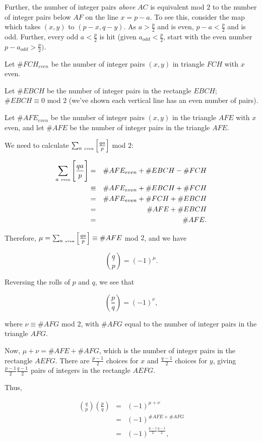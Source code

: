 \documentclass[12pt,letterpaper]{report}
\newcommand\be{\begin{equation}}
\newcommand\ee{\end{equation}}
\newcommand\bea{\begin{eqnarray}}
\newcommand\eea{\end{eqnarray}}
\newcommand\lag[2]{\ensuremath{\left(\frac{#1}{#2}\right)}}
\newcommand{\js}[1]{ { \underline{#1} \choose p} }
\begin{document}
Further, the number of integer pairs \emph{above} $AC$ is
equivalent mod $2$ to the number of integer pairs below $AF$ on
the line $x = p-a$. To see this, consider the map which takes
$(x,y)$ to $(p-x,q-y)$. As $a > \frac{p}{2}$ and is even, $p-a <
\frac{p}{2}$ and is odd. Further, every odd $a < \frac{p}{2}$ is
hit (given $a_{odd} < \frac{p}{2}$, start with the even number $p
- a_{odd} > \frac{p}{2})$.

Let $\# FCH_{even}$ be the number of integer pairs $(x,y)$ in
triangle $FCH$ with $x$ even.

Let $\# EBCH$ be the number of integer pairs in the rectangle
$EBCH$; $\# EBCH \equiv 0$ mod $2$ (we've shown each vertical line
has an even number of pairs).

Let $\# AFE_{even}$ be the number of integer pairs $(x,y)$ in the
triangle $AFE$ with $x$ even, and let $\# AFE$ be the number of
integer pairs in the triangle $AFE$.

We need to calculate $\sum_{a \ \mbox{\tiny even}} \Big[
\frac{qa}{p} \Big]$ mod $2$:

\bea \sum_{a \ \mbox{\tiny even}} \Bigg[ \frac{qa}{p} \Bigg] & = &
\# AFE_{even} + \# EBCH - \# FCH \nonumber\\ & \equiv & \#
AFE_{even} + \# EBCH + \# FCH \nonumber\\ & = & \# AFE_{even} + \#
FCH + \# EBCH \nonumber\\ &=& \# AFE + \# EBCH \nonumber\\ &=& \#
AFE. \eea

Therefore, $\mu = \sum_{a \ \mbox{\tiny even}} \Big[ \frac{qa}{p}
\Big] \equiv \# AFE$ mod $2$, and we have

\be \js{q} = (-1)^\mu. \ee

Reversing the rolls of $p$ and $q$, we see that

\be \lag{p}{q} = (-1)^\nu, \ee

where $\nu \equiv \# AFG$ mod $2$, with $\# AFG$ equal to the
number of integer pairs in the triangle $AFG$.

Now, $\mu + \nu = \# AFE + \# AFG$, which is the number of integer
pairs in the rectangle $AEFG$. There are $\frac{p-1}{2}$ choices
for $x$ and $\frac{q-1}{2}$ choices for $y$, giving
$\frac{p-1}{2}\frac{q-1}{2}$ pairs of integers in the rectangle
$AEFG$.

Thus,

\bea \js{q} \lag{p}{q} & = & (-1)^{\mu + \nu} \nonumber\\ &=&
(-1)^{\# AFE + \# AFG} \nonumber\\ &=&
(-1)^{\frac{p-1}{2}\frac{q-1}{2} }, \eea
\end{document}
